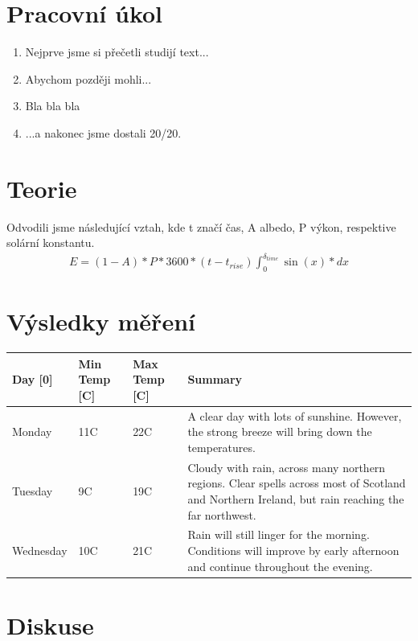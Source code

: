 \documentclass{article}
\author{"Patrik Novotný"}
\begin{document}
\section*{Pracovní úkol}
\begin{enumerate}[label=(\alph*)]
\item Nejprve jsme si přečetli studijí text...
\item Abychom později mohli...
\item Bla bla bla
\item ...a nakonec jsme dostali 20/20.
\end{enumerate}


\section*{Teorie}
\par Odvodili jsme následující vztah, kde t značí čas, A albedo, P výkon, respektive solární konstantu.
\begin{align}
E =(1-A)*P*3600*(t-t_{rise}) \int_{0}^{\delta_{time}} \sin(x)*dx
\end{align}
\section*{Výsledky měření}
\begin{center}
     \label{tab:title} 
    \begin{tabular}{ | l | l | l | p{5cm} |}
    \hline
    Day [0] & Min Temp [C] & Max Temp [C] & Summary \\ \hline
    Monday & 11C & 22C & A clear day with lots of sunshine.  
    However, the strong breeze will bring down the temperatures. \\ \hline
    Tuesday & 9C & 19C & Cloudy with rain, across many northern regions. Clear spells 
    across most of Scotland and Northern Ireland, 
    but rain reaching the far northwest. \\ \hline
    Wednesday & 10C & 21C & Rain will still linger for the morning. 
    Conditions will improve by early afternoon and continue 
    throughout the evening. \\
    \hline
    \end{tabular}
\end{center}

\section*{Diskuse}
\end{document}
